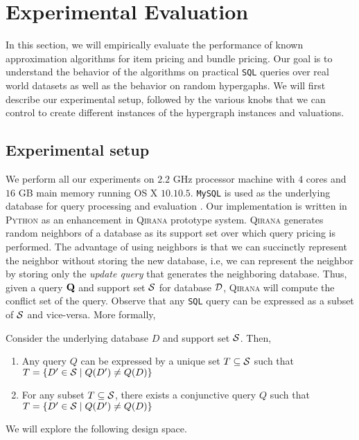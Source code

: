 \section{Experimental Evaluation}

In this section, we will empirically evaluate the performance of known approximation algorithms for item pricing and bundle pricing. Our goal is to understand the behavior of the algorithms on practical \texttt{SQL} queries over real world datasets as well as the behavior on random hypergaphs. We will first describe our experimental setup, followed by the various knobs that we can control to create different instances of the hypergraph instances and valuations. 

\subsection{Experimental setup}

We perform all our experiments on $2.2$ GHz processor machine with $4$ cores and $16$ GB main memory running OS X $10.10.5$. \texttt{MySQL} is used as the underlying database for query processing and evaluation . Our implementation is written in \textsc{Python} as an enhancement in \textsc{Qirana} prototype system. \textsc{Qirana} generates random neighbors of a database as its support set over which query pricing is performed. The advantage of using neighbors is that we can succinctly represent the neighbor without storing the new database, i.e, we can represent the neighbor by storing only the \emph{update query} that generates the neighboring database. Thus, given a query $\mathbf{Q}$ and support set $\mathcal{S}$ for database $\mathcal{D}$, \textsc{Qirana} will compute the conflict set of the query. Observe that any \texttt{SQL} query can be expressed as a subset of $\mathcal{S}$ and vice-versa. More formally,

\begin{proposition}
	Consider the underlying database $D$ and support set $\mathcal{S}$. Then,
	\begin{enumerate}
		\item Any query $Q$ can be expressed by a unique set $T \subseteq \mathcal{S}$ such that $T = \{ D' \in \mathcal{S} \mid Q(D') \neq Q(D)\}$
		\item For any subset $T \subseteq \mathcal{S}$, there exists a conjunctive query $Q$ such that $T = \{ D' \in \mathcal{S} \mid Q(D') \neq Q(D)\}$
	\end{enumerate} 
\end{proposition}	

We will explore the following design space.


